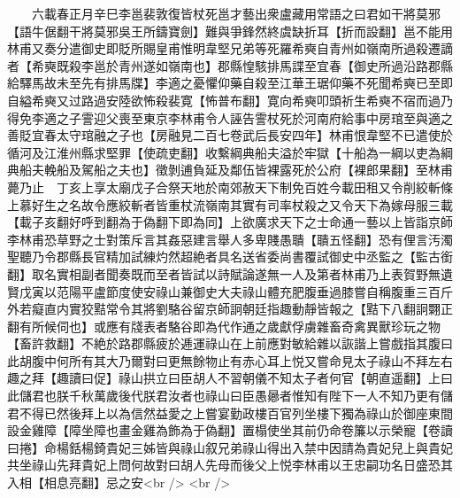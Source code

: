 　　六載春正月辛巳李邕裴敦復皆杖死邕才藝出衆盧藏用常語之曰君如干將莫邪【語牛倨翻干將莫邪吳王所鑄寶劍】難與爭鋒然終虞缺折耳【折而設翻】邕不能用林甫又奏分遣御史即貶所賜皇甫惟明韋堅兄弟等死羅希奭自青州如嶺南所過殺遷謫者【希奭既殺李邕於青州遂如嶺南也】郡縣惶駭排馬諜至宜春【御史所過沿路郡縣給驛馬故未至先有排馬牒】李適之憂懼仰藥自殺至江華王琚仰藥不死聞希奭已至即自縊希奭又过路過安陸欲怖殺裴寛【怖普布翻】寛向希奭叩頭祈生希奭不宿而過乃得免李適之子霅迎父喪至東京李林甫令人誣告霅杖死於河南府給事中房琯至與適之善貶宜春太守琯融之子也【房融見二百七卷武后長安四年】林甫恨韋堅不已遣使於循河及江淮州縣求堅罪【使疏吏翻】收繫綱典船夫溢於牢獄【十船為一綱以吏為綱典船夫輓船及駕船之夫也】徵剝逋負延及鄰伍皆裸露死於公府【裸郎果翻】至林甫薨乃止　丁亥上享太廟戊子合祭天地於南郊赦天下制免百姓今載田租又令削絞斬條上慕好生之名故令應絞斬者皆重杖流嶺南其實有司率杖殺之又令天下為嫁母服三載【載子亥翻好呼到翻為于偽翻下即為同】上欲廣求天下之士命通一藝以上皆詣京師李林甫恐草野之士對策斥言其姦惡建言舉人多卑賤愚聵【聵五怪翻】恐有俚言汚濁聖聽乃令郡縣長官精加試練灼然超絶者具名送省委尚書覆試御史中丞監之【監古銜翻】取名實相副者聞奏既而至者皆試以詩賦論遂無一人及第者林甫乃上表賀野無遺賢戊寅以范陽平盧節度使安祿山兼御史大夫祿山體充肥腹垂過膝嘗自稱腹重三百斤外若癡直内實狡黠常令其將劉駱谷留京師詗朝廷指趣動靜皆報之【黠下八翻詗翾正翻有所候伺也】或應有牋表者駱谷即為代作通之歲獻俘虜雜畜奇禽異獸珍玩之物【畜許救翻】不絶於路郡縣疲於逓運祿山在上前應對敏給雜以詼諧上嘗戲指其腹曰此胡腹中何所有其大乃爾對曰更無餘物止有赤心耳上悦又嘗命見太子祿山不拜左右趣之拜【趣讀曰促】祿山拱立曰臣胡人不習朝儀不知太子者何官【朝直遥翻】上曰此儲君也朕千秋萬歲後代朕君汝者也祿山曰臣愚曏者惟知有陛下一人不知乃更有儲君不得已然後拜上以為信然益愛之上嘗宴勤政樓百官列坐樓下獨為祿山於御座東間設金雞障【障坐障也畫金雞為飾為于偽翻】置榻使坐其前仍命卷簾以示榮寵【卷讀曰捲】命楊銛楊錡貴妃三姊皆與祿山叙兄弟祿山得出入禁中因請為貴妃兒上與貴妃共坐祿山先拜貴妃上問何故對曰胡人先母而後父上悦李林甫以王忠嗣功名日盛恐其入相【相息亮翻】忌之安<br />
<br />
